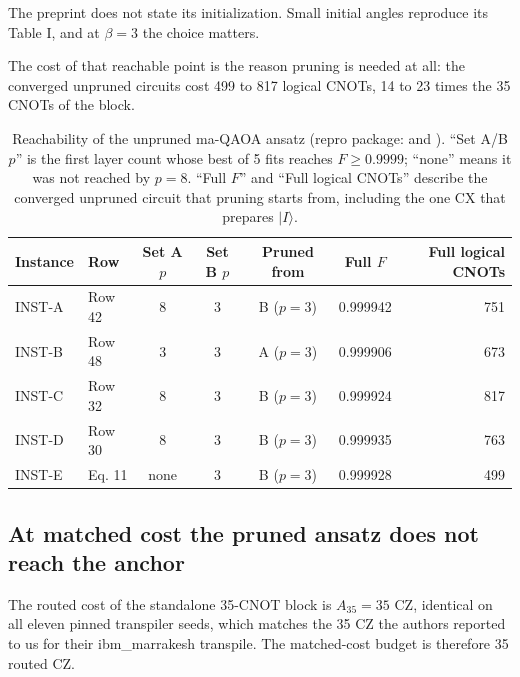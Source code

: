 \documentclass[11pt]{article}
\begin{document}
The preprint does not state its initialization. Small initial angles reproduce its Table I, and at $\beta = 3$ the choice matters.

The cost of that reachable point is the reason pruning is needed at all: the converged unpruned circuits cost 499 to 817 logical CNOTs, 14 to 23 times the 35 CNOTs of the block.

\begin{table}[t]
\centering
\begin{tabular}{llccccr}
\toprule
Instance & Row & Set A $p$ & Set B $p$ & Pruned from & Full $F$ & Full logical CNOTs \\
\midrule
INST-A & Row 42 & 8 & 3 & B ($p=3$) & 0.999942 & 751 \\
INST-B & Row 48 & 3 & 3 & A ($p=3$) & 0.999906 & 673 \\
INST-C & Row 32 & 8 & 3 & B ($p=3$) & 0.999924 & 817 \\
INST-D & Row 30 & 8 & 3 & B ($p=3$) & 0.999935 & 763 \\
INST-E & Eq. 11 & none & 3 & B ($p=3$) & 0.999928 & 499 \\
\bottomrule
\end{tabular}
\caption[]{Reachability of the unpruned ma-QAOA ansatz (repro package:  and ). ``Set A/B $p$'' is the first layer count whose best of 5 fits reaches $F \geq 0.9999$; ``none'' means it was not reached by $p = 8$. ``Full $F$'' and ``Full logical CNOTs'' describe the converged unpruned circuit that pruning starts from, including the one CX that prepares $|I\rangle$.}
\label{tab:reach}
\end{table}

\subsection{At matched cost the pruned ansatz does not reach the anchor}

The routed cost of the standalone 35-CNOT block is $A_{35} = 35$ CZ, identical on all eleven pinned transpiler seeds, which matches the 35 CZ the authors reported to us for their ibm\_marrakesh transpile. The matched-cost budget is therefore 35 routed CZ.
\end{document}
